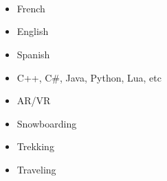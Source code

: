 %
%
%

\threecolumnsection
{
 \\
\\
 \\
}
{
\begin{itemize}
	\item{French}
	\item{English}
	\item{Spanish}
	\item{C++, C\#, Java, Python, Lua, etc}
\end{itemize}}
{
\vspace{1em}
\begin{itemize}
	\item AR/VR
	\item Snowboarding
    \item Trekking
	\item Traveling
\end{itemize}
}
